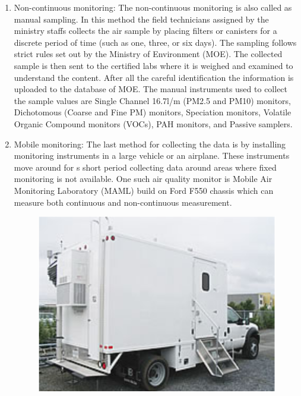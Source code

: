 \begin{enumerate}
  \item Non-continuous monitoring: The non-continuous monitoring is also called as manual sampling. In this method the field technicians assigned by the ministry staffs collects the air sample by placing filters or canisters for a discrete period of time (such as one, three, or six days). The sampling follows strict rules set out by the Ministry of Environment (MOE). The collected sample is then sent to the certified labs where it is weighed and examined to understand the content. After all the careful identification the information is uploaded to the database of MOE. The manual instruments used to collect the sample values are Single Channel 16.7l/m (PM2.5 and PM10) monitors, Dichotomous (Coarse and Fine PM) monitors, Speciation monitors, Volatile Organic Compound monitors (VOCs), PAH monitors, and Passive samplers.
  


  \item Mobile monitoring: The last method for collecting the data is by installing monitoring instruments in a large vehicle or an airplane. These instruments move around for s short period collecting data around areas where fixed monitoring is not available. One such air quality monitor is  Mobile Air Monitoring Laboratory (MAML) \cite{MAML} build on Ford F550 chassis which can measure both continuous and non-continuous measurement. 
  



  \begin{figure}[h]
    \begin{center}
    \includegraphics[scale= 0.60]{./images/figure38.png}
    \end{center}
   

\end{figure}
\end{enumerate}
